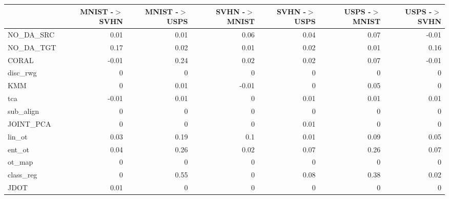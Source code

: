 \begin{tabular}{lrrrrrr}
\hline
           &   MNIST -\ensuremath{>} SVHN &   MNIST -\ensuremath{>} USPS &   SVHN -\ensuremath{>} MNIST &   SVHN -\ensuremath{>} USPS &   USPS -\ensuremath{>} MNIST &   USPS -\ensuremath{>} SVHN \\
\hline
 NO\_DA\_SRC &            0.01 &            0.01 &            0.06 &           0.04 &            0.07 &          -0.01 \\
 NO\_DA\_TGT &            0.17 &            0.02 &            0.01 &           0.02 &            0.01 &           0.16 \\
 CORAL     &           -0.01 &            0.24 &            0.02 &           0.02 &            0.07 &          -0.01 \\
 disc\_rwg  &            0    &            0    &            0    &           0    &            0    &           0    \\
 KMM       &            0    &            0.01 &           -0.01 &           0    &            0.05 &           0    \\
 tca       &           -0.01 &            0.01 &            0    &           0.01 &            0.01 &           0.01 \\
 sub\_align &            0    &            0    &            0    &           0    &            0    &           0    \\
 JOINT\_PCA &            0    &            0    &            0    &           0.01 &            0    &           0    \\
 lin\_ot    &            0.03 &            0.19 &            0.1  &           0.01 &            0.09 &           0.05 \\
 ent\_ot    &            0.04 &            0.26 &            0.02 &           0.07 &            0.26 &           0.07 \\
 ot\_map    &            0    &            0    &            0    &           0    &            0    &           0    \\
 class\_reg &            0    &            0.55 &            0    &           0.08 &            0.38 &           0.02 \\
 JDOT      &            0.01 &            0    &            0    &           0    &            0    &           0    \\
\hline
\end{tabular}